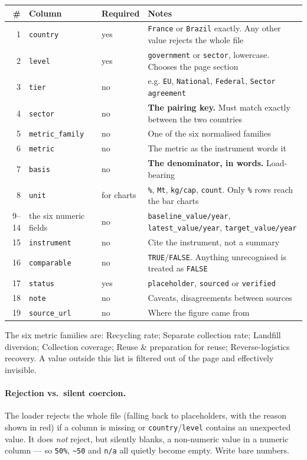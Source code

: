 \documentclass[11pt,a4paper]{article}
\newcommand{\file}[1]{\texttt{#1}}
\begin{document}
\begin{longtable}{@{}rL{3.1cm}L{2.0cm}L{7.0cm}@{}}
\toprule
\textbf{\#} & \textbf{Column} & \textbf{Required} & \textbf{Notes} \\
\midrule
{} & \file{country} & yes & \file{France} or \file{Brazil} exactly. Any other
value rejects the whole file \\
2 & \file{level} & yes & \file{government} or \file{sector}, lowercase. Chooses
the page section \\
3 & \file{tier} & no & e.g. \file{EU}, \file{National}, \file{Federal},
\file{Sector agreement} \\
4 & \file{sector} & no & \textbf{The pairing key.} Must match exactly between
the two countries \\
5 & \file{metric\_family} & no & One of the six normalised families \\
6 & \file{metric} & no & The metric as the instrument words it \\
7 & \file{basis} & no & \textbf{The denominator, in words.} Load-bearing \\
8 & \file{unit} & for charts & \file{\%}, \file{Mt}, \file{kg/cap},
\file{count}. Only \file{\%} rows reach the bar charts \\
9--14 & the six numeric fields & no & \file{baseline\_value/year},
\file{latest\_value/year}, \file{target\_value/year} \\
15 & \file{instrument} & no & Cite the instrument, not a summary \\
16 & \file{comparable} & no & \file{TRUE}/\file{FALSE}. Anything unrecognised
is treated as \file{FALSE} \\
17 & \file{status} & yes & \file{placeholder}, \file{sourced} or
\file{verified} \\
18 & \file{note} & no & Caveats, disagreements between sources \\
19 & \file{source\_url} & no & Where the figure came from \\
\bottomrule
\end{longtable}

The six metric families are: Recycling rate; Separate collection rate; Landfill
diversion; Collection coverage; Reuse \& preparation for reuse;
Reverse-logistics recovery. A value outside this list is filtered out of the
page and effectively invisible.

\paragraph{Rejection vs.\ silent coercion.} The loader rejects the whole file
(falling back to placeholders, with the reason shown in red) if a column is
missing or \file{country}/\file{level} contains an unexpected value. It does
\emph{not} reject, but silently blanks, a non-numeric value in a numeric
column --- so \file{50\%}, \file{\textasciitilde 50} and \file{n/a} all quietly
become empty. Write bare numbers.
\end{document}
